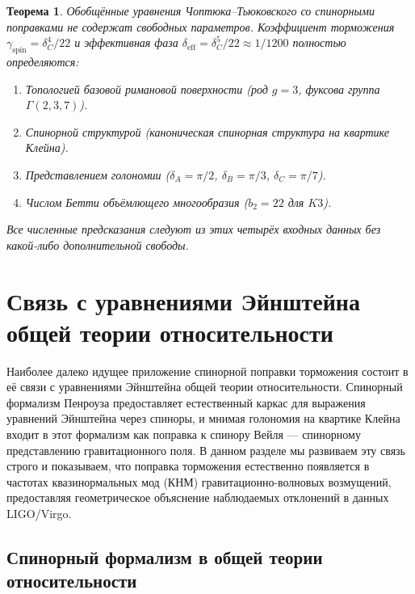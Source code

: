 \documentclass[12pt,a4paper]{article}
\newtheorem{theorem}{Теорема}[section]
\theoremstyle{definition}
\theoremstyle{remark}
\begin{document}
\begin{theorem}
\label{thm:unified-gCT-ru}
Обобщённые уравнения Чоптюка--Тьюковского со спинорными поправками не содержат свободных параметров. Коэффициент торможения $\gamma_{\mathrm{spin}} = \delta_C^4/22$ и эффективная фаза $\delta_{\mathrm{eff}} = \delta_C^5/22 \approx 1/1200$ полностью определяются:
\begin{enumerate}[label=(\roman*)]
\item Топологией базовой римановой поверхности (род $g = 3$, фуксова группа $\Gamma(2,3,7)$).
\item Спинорной структурой (каноническая спинорная структура на квартике Клейна).
\item Представлением голономии ($\delta_A = \pi/2$, $\delta_B = \pi/3$, $\delta_C = \pi/7$).
\item Числом Бетти объёмлющего многообразия ($b_2 = 22$ для $K3$).
\end{enumerate}
Все численные предсказания следуют из этих четырёх входных данных без какой-либо дополнительной свободы.
\end{theorem}

\section{Связь с уравнениями Эйнштейна общей теории относительности}
\label{sec:einstein-ru}

Наиболее далеко идущее приложение спинорной поправки торможения состоит в её связи с уравнениями Эйнштейна общей теории относительности. Спинорный формализм Пенроуза предоставляет естественный каркас для выражения уравнений Эйнштейна через спиноры, и мнимая голономия на квартике Клейна входит в этот формализм как поправка к спинору Вейля --- спинорному представлению гравитационного поля. В данном разделе мы развиваем эту связь строго и показываем, что поправка торможения естественно появляется в частотах квазинормальных мод (КНМ) гравитационно-волновых возмущений, предоставляя геометрическое объяснение наблюдаемых отклонений в данных LIGO/Virgo.

\subsection{Спинорный формализм в общей теории относительности}
\end{document}
